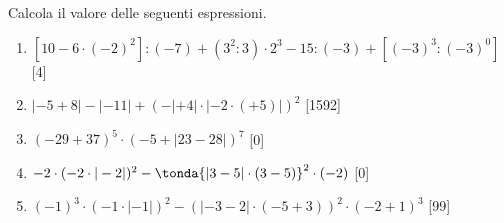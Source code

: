 \begin{esercizio} %
Calcola il valore delle seguenti espressioni.
 \begin{enumerate}[noitemsep, label=(\alph*)]
 \item \([10-6\cdot(-2)^2]:(-7)+(3^2:3)\cdot2^3-15:(-3)+[(-3)^3:(-3)^0]\)
  \hfill[4]
 \item \(|-5+8|-|-11|+(-|+4|\cdot|-2\cdot(+5)|)^2\) \hfill[1592]
 \item \((-29+37)^5\cdot(-5+|23-28|)^7\) \hfill[0]
 \item \(-2\cdot(-2\cdot|-2|)^2-\tonda{|3-5|\cdot(3-5) }^2\cdot(-2)\)
  \hfill[0]
 \item \((-1)^3\cdot(-1\cdot|-1|)^2-(|-3-2|\cdot(-5+3))^2\cdot(-2+1)^3\)
  \hfill[99]
 \end{enumerate}
\end{esercizio}
